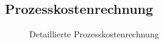 \subsection{Prozesskostenrechnung}
\label{app:Prozesskosten}
\begin{figure}[htb]
\centering
{}
\caption{Detaillierte Prozesskostenrechnung}
\end{figure}

